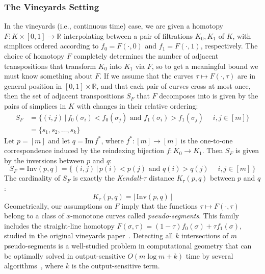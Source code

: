 \documentclass{siamart190516}
\begin{document}
\subsubsection{The Vineyards Setting}\label{sec:continuous_setting}
In the vineyards (i.e., continuous time) case, we are given a homotopy $F : K \times [0,1] \to \mathbb{R}$ interpolating between  a pair of filtrations $K_0, K_1$ of $K$, with simplices  ordered according to $f_0 = F(\cdot, 0)$ and $f_1 = F(\cdot, 1)$, respectively. 
The choice of homotopy $F$ completely determines the number of adjacent transpositions that transform $K_0$ into $K_1$ via $F$, so to get a meaningful bound we must know something about $F$. 
If we assume that the curves $\tau \mapsto F(\cdot, \tau)$  are in general position in $[0,1]\times \mathbb{R}$, and that each pair of curves cross  at most once, then the set of adjacent transpositions $S_F$ that $F$ decomposes into is given by the pairs of simplices in $K$ with changes in their relative ordering:
\begin{align}\label{eq:sf_schedule}
	S_F &= \{ (i,j) \, | \, f_0(\sigma_i) < f_0(\sigma_j) \mbox{ and }  f_1(\sigma_i) > f_1(\sigma_j) \quad  \; i,j \in [m] \} \\
	&= \{ s_1, s_2, \dots, s_k \}
\end{align}
Let $p = [m]$ and let $q = \mathrm{Im}\,f^\ast$, where $f^\ast : [m] \to [m]$ is the one-to-one correspondence induced by the reindexing bijection $f: K_0 \to K_1$. Then $S_F$ is given by the inversions between $p$ and $q$:
\[S_F = 
\mathrm{Inv}(p, q) = \{ \, (i,j) \, | \, p(i) < p(j) \mbox{ and } q(i) > q(j)  \quad \; i,j \in [m]\, \}
\]
The cardinality of $  S_F $ is exactly the \emph{Kendall}-$\tau$ distance $K_\tau(p,q)$ between $p$ and $q$: 
\begin{equation}\label{eq:kendall_dist}
	K_\tau(p, q) = \lvert \, \mathrm{Inv}(p, q) \, \rvert
\end{equation}
Geometrically, our assumptions on $F$ imply that the  functions $\tau\mapsto F(\cdot, \tau)$ belong to a class of $x$-monotone curves called \emph{pseudo-segments}.
This family includes 
the straight-line homotopy $F(\sigma, \tau) = (1 - \tau) f_0(\sigma) + \tau f_1(\sigma)$,   studied in the original vineyards paper~\cite{cohen2006vines}. Detecting all $k$ intersections of $m$ pseudo-segments is a well-studied problem in computational geometry that can be optimally solved in output-sensitive $O(m \log m + k)$ time by several algorithms~\cite{boissonnat2000efficient}, where $k$ is the output-sensitive term. 
\end{document}
